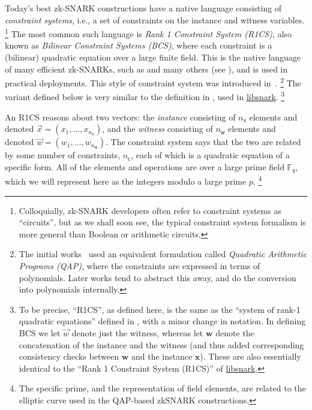 \documentclass[a4paper,12pt]{article}
\newcommand{\FieldSize}{q}
\newcommand{\Field}{\mathbb{F}_{\FieldSize}} %
\newcommand{\NumConstr}{n_{\mathsf{c}}}
\newcommand{\NumWit}{{n_{\mathsf{w}}}}
\newcommand{\NumInst}{{n_{\mathsf{x}}}}
\newcommand{\inst}{x}
\newcommand{\wit}{w}
\newcommand{\vinst}{\vec{\inst}}
\newcommand{\vwit}{\vec{\wit}}
\begin{document}
Today's best zk-SNARK constructions have a native language consisting of \emph{constraint systems}, i.e., a set of constraints on the instance and witness variables.%
%
\footnote{Colloquially, zk-SNARK developers often refer to constraint systems as ``circuits'', but as we shall soon see, the typical constraint system formalism is more general than Boolean or arithmetic circuits.} %
%
The most common such language is \emph{Rank 1 Constraint System (R1CS)}, also known as \emph{Bilinear Constraint Systems (BCS)}, where each constraint is a (bilinear) quadratic equation over a large finite field.  This is the native language of many efficient zk-SNARKs, such as \cite{GGPR13qsp,PHGR13pinocchio,BCGTV13csnark-crypto,BCTV13von,Groth16size} and many others (see ), and is used in practical deployments.
This style of constraint system was introduced in~\cite{GGPR13qsp}.%
%
\footnote{The initial works~\cite{GGPR13qsp,PHGR13pinocchio} used an equivalent formulation called \emph{Quadratic Arithmetic Programs (QAP)}, where the constraints are expressed in terms of polynomials. Later works tend to abstract this away, and do the conversion into polynomials internally.} %
%
The variant defined below is very similar to the definition in \cite[Appendix~E]{BCGTV13csnark-eprint}, used in \href{https://github.com/scipr-lab/libsnark}{libsnark}.%
%
\footnote{To be precise, ``R1CS'', as defined here, is the same as the ``system of rank-1 quadratic equations'' defined in \cite[Appendix~E]{BCGTV13csnark-eprint}, with a minor change in notation. In defining BCS we let $\vwit$ denote just the witness, whereas \cite{BCGTV13csnark-eprint} let $\mathbf{w}$ denote the concatenation of the instance and the witness (and thus added corresponding consistency checks between $\mathbf{w}$ and the instance $\mathbf{x}$). These are also essentially identical to the ``Rank 1 Constraint System (R1CS)'' of \href{https://github.com/scipr-lab/libsnark}{libsnark}.}

An R1CS reasons about two vectors: the \emph{instance} consisting of $\NumInst$ elements and denoted $\vinst=(\inst_1,\ldots,\inst_\NumInst)$, and the \emph{witness} consisting of $\NumWit$ elements and denoted $\vwit=(\wit_1,\ldots,\wit_\NumWit)$. The constraint system says that the two are related by some number of constraints, $\NumConstr$, each of which is a quadratic equation of a specific form. All of the elements and operations are over a large prime field $\Field$, which we will represent here as the integers modulo a large prime $p$.%
\footnote{The specific prime, and the representation of field elements, are related to the elliptic curve used in the QAP-based zkSNARK constructions.}
\end{document}
